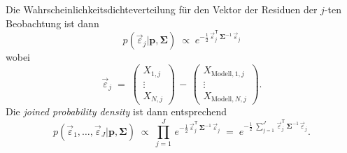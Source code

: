 Die Wahrscheinlichkeitsdichteverteilung für den Vektor der Residuen der
$j$-ten Beobachtung ist dann
\begin{equation}
p(\vec \varepsilon_j | \mathbf{p}, \boldsymbol{\Sigma}) \; \propto \;
e^{-\frac{1}{2} \, \vec \varepsilon^\mathsf{T}_j \, \boldsymbol{\Sigma}^{-1} \, \vec \varepsilon_j }
\end{equation}
wobei
\begin{equation}
\vec \varepsilon_j \; = \;
\left(\begin{array}{c}
X_{1,j}\\
\vdots\\
X_{N,j}
\end{array}\right) \, - \,
\left(\begin{array}{c}
X_{\mathrm{Modell},1,j}\\
\vdots \\
X_{\mathrm{Modell},N,j}
\end{array}\right) .
\label{Residuen}
\end{equation}
Die \textsl{joined probability density} ist dann entsprechend
\begin{equation}
p(\vec \varepsilon_1,\dots, \vec \varepsilon_J | \mathbf{p}, \boldsymbol{\Sigma}) \; \propto \;
\prod\limits_{j=1}^J \,
e^{-\frac{1}{2} \, \vec \varepsilon^\mathsf{T}_j \, \boldsymbol{\Sigma}^{-1} \, \vec \varepsilon_j } \; = \;
e^{-\frac{1}{2} \; \sum\limits_{j=1}^J \, \vec \varepsilon^\mathsf{T}_j \, \boldsymbol{\Sigma}^{-1} \, \vec \varepsilon_j } .
\label{LikelihoodKov}
\end{equation}


